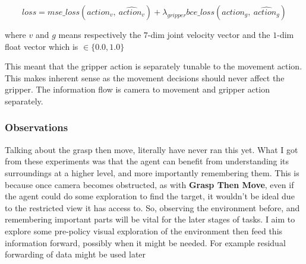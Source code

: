 \[
  loss = mse\_loss \left(action_{v}, ~\hat{action_v}\right) 
  + 
  \lambda_{gripper} bce\_loss\left( action_{g}, ~\hat{action_g}\right)
\]

where $v$ and $g$ means respectively the $7$-dim joint velocity vector and the $1$-dim float vector which is \( \in \{ 0.0, 1.0 \}\)

This meant that the gripper action is separately tunable to the movement action. This makes inherent sense as the movement decisions should never affect the gripper. The information flow is camera to movement and gripper action separately.  




\subsubsection{Observations}
Talking about the grasp then move, literally have never ran this yet.
What I got from these experiments was that the agent can benefit from understanding its surroundings at a higher level, and more importantly remembering them. This is because once  camera becomes obstructed, as with \textbf{Grasp Then Move}, even if the agent could do some exploration to find the target, it wouldn't be ideal due to the restricted view it has access to. So, observing the environment before, and remembering important parts will be vital for the later stages of tasks. I aim to explore some pre-policy visual exploration of the environment then feed this information forward, possibly when it might be needed. For example residual forwarding of data might be used later 


